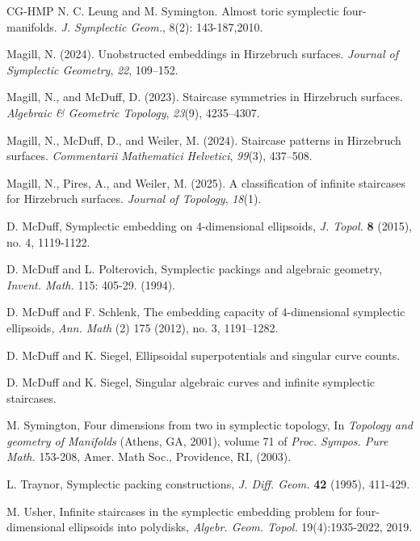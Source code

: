 \documentclass[11pt, reqno]{amsart}
\theoremstyle{remark}
\numberwithin{equation}{subsection}
\numberwithin{figure}{section}
\theoremstyle{customremark}
\newcommand{\C}{\mathbb{C}}
\begin{document}
\begin{thebibliography}{CG-HMP}
 N. C. Leung and M. Symington. Almost toric symplectic four-manifolds. {\it J. Symplectic Geom.}, 8(2): 143-187,2010. 



 Magill, N. (2024). Unobstructed embeddings in Hirzebruch surfaces. \textit{Journal of Symplectic Geometry}, \textit{22}, 109--152.

 Magill, N., and McDuff, D. (2023). Staircase symmetries in Hirzebruch surfaces. \textit{Algebraic \& Geometric Topology}, \textit{23}(9), 4235--4307.


 Magill, N., McDuff, D., and Weiler, M. (2024). Staircase patterns in Hirzebruch surfaces. \textit{Commentarii Mathematici Helvetici}, \textit{99}(3), 437--508.

 Magill, N., Pires, A., and Weiler, M. (2025). A classification of infinite staircases for Hirzebruch surfaces. \textit{Journal of Topology}, \textit{18}(1).

 D. McDuff, Symplectic embedding on 4-dimensional ellipsoids, {\it J. Topol.} {\bf 8} (2015), no. 4, 1119-1122. 

 D. McDuff and L. Polterovich, Symplectic packings and algebraic geometry, {\it Invent. Math.} 115: 405-29. (1994). 

D. McDuff and F. Schlenk, The embedding capacity of 4-dimensional symplectic ellipsoids, {\it Ann. Math}  (2) 175 (2012), no. 3, 1191--1282.

 D. McDuff and K. Siegel, Ellipsoidal superpotentials and singular curve counts. 

 D. McDuff and K. Siegel, Singular algebraic curves and infinite symplectic staircases. 



M. Symington, Four dimensions from two in symplectic topology, In {\it Topology and geometry of Manifolds} (Athens, GA, 2001), volume 71 of {\it Proc. Sympos. Pure Math.} 153-208, Amer. Math Soc., Providence, RI, (2003).

L. Traynor, Symplectic packing constructions, {\it J. Diff. Geom.} {\bf 42} (1995), 411-429. 

M. Usher, Infinite staircases in the symplectic embedding problem for four-dimensional ellipsoids into polydisks, {\it Algebr. Geom. Topol.} 19(4):1935-2022, 2019.


\end{thebibliography}
\end{document}
